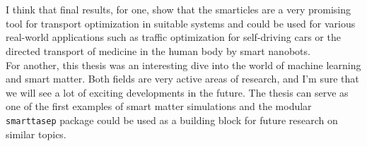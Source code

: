 \\
\\
I think that final results, for one, show that the smarticles are a very promising tool for transport optimization in suitable systems and could be used for various real-world applications such as traffic optimization for self-driving cars or the directed transport of medicine in the human body by smart nanobots. 
\\
For another, this thesis was an interesting dive into the world of machine learning and smart matter. Both fields are very active areas of research, and I'm sure that we will see a lot of exciting developments in the future. The thesis can serve as one of the first examples of smart matter simulations and the modular \texttt{smarttasep} package could be used as a building block for future research on similar topics. 
\\
\\

